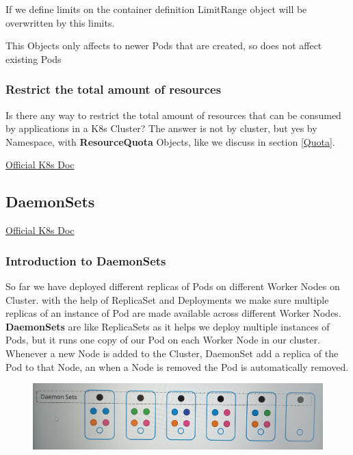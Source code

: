 \documentclass{article}
\newenvironment{blocktemplateIII}[1]{%
    \tcolorbox[beamer,%
    noparskip,breakable,
    ,colframe=Red,%
    colbacklower=LimeGreen!75!LightGreen,%
    title=#1]}%
    {\endtcolorbox}
\begin{document}
\begin{blocktemplateIII}{WARNING 1}
If we define limits on the container definition LimitRange object will be overwritten by this limits.
\end{blocktemplateIII}

\begin{blocktemplateIII}{WARNING 2}
This Objects only affects to newer Pods that are created, so does not affect existing Pods
\end{blocktemplateIII}

\subsubsection{Restrict the total amount of resources}

Is there any way to restrict the total amount of resources that can be consumed by applications in a K8s Cluster? The answer is not by cluster, but yes by Namespace, with \textbf{ResourceQuota} Objects, like we discuss in section \ref{Quota}.

\href{https://kubernetes.io/docs/tasks/administer-cluster/manage-resources/quota-memory-cpu-namespace/}{Official K8s Doc}

\subsection{DaemonSets}

\href{https://kubernetes.io/es/docs/concepts/workloads/controllers/daemonset/}{Official K8s Doc}

\subsubsection{Introduction to DaemonSets}

So far we have deployed different replicas of Pods on different Worker Nodes on Cluster. with the help of ReplicaSet and Deployments we make sure multiple replicas of an instance of Pod are made available across different Worker Nodes. \textbf{DaemonSets} are like ReplicaSets as it helps we deploy multiple instances of Pods, but it runs one copy of our Pod on each Worker Node in our cluster. Whenever a new Node is added to the Cluster, DaemonSet add a replica of the Pod to that Node, an when a Node is removed the Pod is automatically removed.

\begin{figure}[H]
    \includegraphics[width=\textwidth]{pictures/ds.png}
\end{figure}
\end{document}
